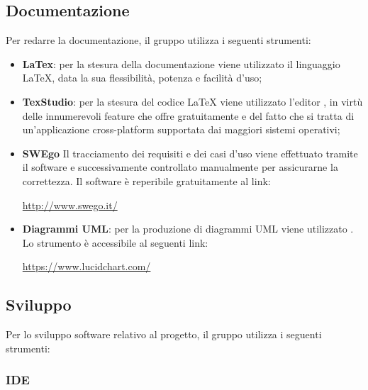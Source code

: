 \documentclass[../NormediProgetto.tex]{subfiles}
\begin{document}
	
	\subsection{Documentazione}
	
	
	Per redarre la documentazione, il gruppo utilizza i seguenti strumenti:
	
	\begin{itemize}
		\item \textbf{LaTex}: per la stesura della documentazione viene utilizzato il linguaggio \LaTeX{}, data la sua flessibilità, potenza e facilità d'uso;
		
		\item \textbf{TexStudio}: per la stesura del codice \LaTeX{} viene utilizzato l’editor , in virtù delle innumerevoli feature che offre gratuitamente e del fatto che si tratta di un'applicazione cross-platform supportata dai maggiori sistemi operativi;
		
		\item \textbf{SWEgo} Il tracciamento dei requisiti e dei casi d'uso viene effettuato tramite il software  e successivamente controllato manualmente per assicurarne la correttezza. Il software è reperibile gratuitamente al link:
		\begin{center}
			\url{http://www.swego.it/}
		\end{center}
		
		\item \textbf{Diagrammi UML}: per la produzione di diagrammi UML viene utilizzato . Lo strumento è accessibile al seguenti link: 
		
		\begin{center}
			\centerline{\url{https://www.lucidchart.com/}}
		\end{center}
			
	\end{itemize}


	\subsection{Sviluppo}

	Per lo sviluppo software relativo al progetto, il gruppo utilizza i seguenti strumenti:

	\subsubsection{IDE}
\end{document}
